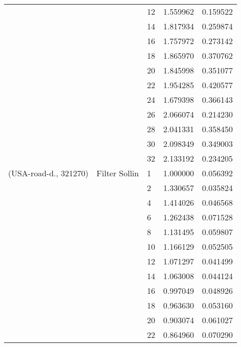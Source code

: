 \begin{tabular}{lllrr}
                      &                     & 12 &  1.559962 &  0.159522 \\
                      &                     & 14 &  1.817934 &  0.259874 \\
                      &                     & 16 &  1.757972 &  0.273142 \\
                      &                     & 18 &  1.865970 &  0.370762 \\
                      &                     & 20 &  1.845998 &  0.351077 \\
                      &                     & 22 &  1.954285 &  0.420577 \\
                      &                     & 24 &  1.679398 &  0.366143 \\
                      &                     & 26 &  2.066074 &  0.214230 \\
                      &                     & 28 &  2.041331 &  0.358450 \\
                      &                     & 30 &  2.098349 &  0.349003 \\
                      &                     & 32 &  2.133192 &  0.234205 \\
(USA-road-d., 321270) & Filter Sollin & 1  &  1.000000 &  0.056392 \\
                      &                     & 2  &  1.330657 &  0.035824 \\
                      &                     & 4  &  1.414026 &  0.046568 \\
                      &                     & 6  &  1.262438 &  0.071528 \\
                      &                     & 8  &  1.131495 &  0.059807 \\
                      &                     & 10 &  1.166129 &  0.052505 \\
                      &                     & 12 &  1.071297 &  0.041499 \\
                      &                     & 14 &  1.063008 &  0.044124 \\
                      &                     & 16 &  0.997049 &  0.048926 \\
                      &                     & 18 &  0.963630 &  0.053160 \\
                      &                     & 20 &  0.903074 &  0.061027 \\
                      &                     & 22 &  0.864960 &  0.070290 \\

\end{tabular}
